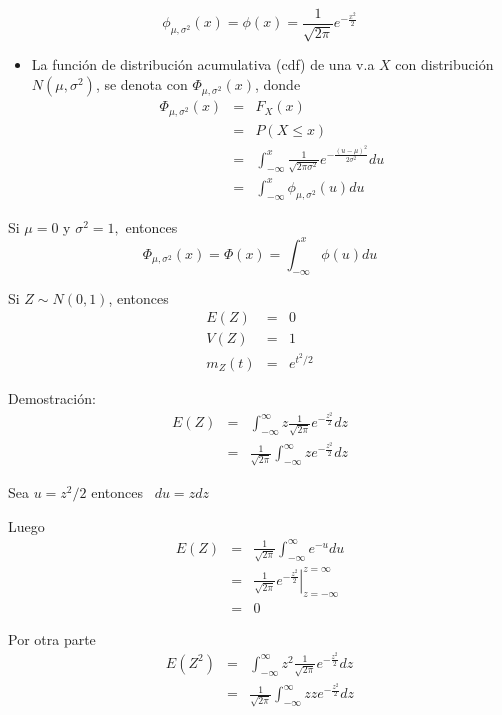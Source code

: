 \begin{i}
\begin{equation*}
\phi _{\mu ,\sigma ^{2}}(x)=\phi (x)=\frac{1}{\sqrt{2\pi }}e^{-\frac{x^{2}}{2%
}}
\end{equation*}


\begin{itemize}
\item La función de distribución acumulativa (cdf) de una v.a $X$ con distribución $N(\mu ,\sigma ^{2})$, se denota con $\Phi _{\mu,\sigma ^{2}}(x)$, donde 
\begin{eqnarray*}
\Phi _{\mu ,\sigma ^{2}}(x) &=&F_{X}(x) \\
&=&P(X\leq x) \\
&=&\int_{-\infty }^{x}\frac{1}{\sqrt{2\pi \sigma ^{2}}}e^{-\frac{(u-\mu )^{2}%
}{2\sigma ^{2}}}du \\
&=&\int_{-\infty }^{x}\phi _{\mu ,\sigma ^{2}}(u)du
\end{eqnarray*}
\end{itemize}

Si $\mu =0$ y $\sigma ^{2}=1,$ entonces
\begin{equation*}
\Phi _{\mu ,\sigma ^{2}}(x)=\Phi (x)=\int_{-\infty }^{x}\phi (u)du
\end{equation*}

\begin{theorem}
Si $Z\sim N(0,1)$, entonces 
\begin{eqnarray*}
E(Z) &=&0 \\
V(Z) &=&1 \\
m_{Z}(t) &=&e^{t^{2}/2}
\end{eqnarray*}
\end{theorem} 

Demostración: 
\begin{eqnarray*}
E(Z) &=&\int_{-\infty }^{\infty }z\frac{1}{\sqrt{2\pi }}e^{-\frac{z^{2}}{2}
}dz \\
&=&\frac{1}{\sqrt{2\pi }}\int_{-\infty }^{\infty }ze^{-\frac{z^{2}}{2}}dz
\end{eqnarray*}

Sea $u=z^{2}/2$ entonces \ $du=zdz$

Luego
\begin{eqnarray*}
E(Z) &=&\frac{1}{\sqrt{2\pi }}\int_{-\infty }^{\infty }e^{-u}du \\
&=&\frac{1}{\sqrt{2\pi }}\left. e^{-\frac{z^{2}}{2}}\right\vert _{z=-\infty
}^{z=\infty } \\
&=&0
\end{eqnarray*}

Por otra parte 
\begin{eqnarray*}
E(Z^{2}) &=&\int_{-\infty }^{\infty }z^{2}\frac{1}{\sqrt{2\pi }}e^{-\frac{
z^{2}}{2}}dz \\
&=&\frac{1}{\sqrt{2\pi }}\int_{-\infty }^{\infty }zze^{-\frac{z^{2}}{2}}dz
\end{eqnarray*}


\end{i}
